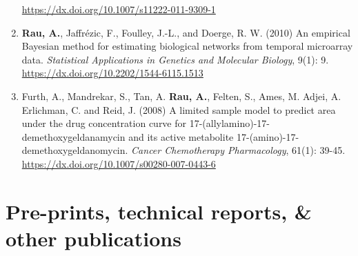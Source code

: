 \documentclass[11pt, a4paper]{awesome-cv}
\begin{document}
\begin{enumerate}
  \url{https://dx.doi.org/10.1007/s11222-011-9309-1}
\item
  \textbf{Rau, A.}, Jaffrézic, F., Foulley, J.-L., and Doerge, R. W.
  (2010) An empirical Bayesian method for estimating biological networks
  from temporal microarray data. \emph{Statistical Applications in
  Genetics and Molecular Biology}, 9(1): 9.
  \url{https://dx.doi.org/10.2202/1544-6115.1513}
\item
  Furth, A., Mandrekar, S., Tan, A. \textbf{Rau, A.}, Felten, S., Ames,
  M. Adjei, A. Erlichman, C. and Reid, J. (2008) A limited sample model
  to predict area under the drug concentration curve for
  17-(allylamino)-17-demethoxygeldanamycin and its active metabolite
  17-(amino)-17-demethoxygeldanomycin. \emph{Cancer Chemotherapy
  Pharmacology}, 61(1): 39-45.
  \url{https://dx.doi.org/10.1007/s00280-007-0443-6}
\end{enumerate}

\hypertarget{pre-prints-technical-reports-other-publications}{%
\section{Pre-prints, technical reports, \& other
publications}\label{pre-prints-technical-reports-other-publications}}
\end{document}
